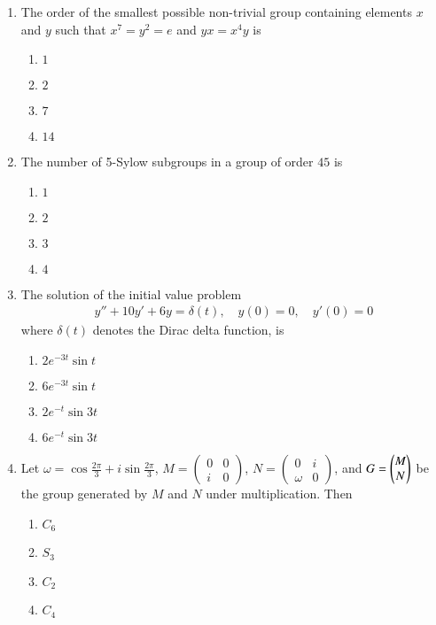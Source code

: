\documentclass[journal]{IEEEtran}
\numberwithin{equation}{enumi}
\numberwithin{figure}{enumi}
\begin{document}
\begin{enumerate}
\item
The order of the smallest possible non-trivial group containing elements $x$ and $y$ such that $x^7 = y^2 = e$ and $yx = x^4 y$ is
\hfill{}
\begin{multicols}{4}
\begin{enumerate}
\item $1$
\item $2$
\item $7$
\item $14$
\end{enumerate}
\end{multicols}

\item
The number of 5-Sylow subgroups in a group of order $45$ is
\hfill{}
\begin{multicols}{4}
\begin{enumerate}
\item $1$
\item $2$
\item $3$
\item $4$
\end{enumerate}
\end{multicols}

\item
The solution of the initial value problem
\begin{align}
y'' + 10y' + 6y = \delta(t), \quad y(0) = 0, \quad y'(0) = 0
\end{align}
where $\delta(t)$ denotes the Dirac delta function, is
\hfill{}
\begin{multicols}{2}
\begin{enumerate}
\item $2 e^{-3t} \sin t$
\item $6 e^{-3t} \sin t$
\item $2 e^{-t} \sin 3t$
\item $6 e^{-t} \sin 3t$
\end{enumerate}
\end{multicols}

\item
Let $\omega = \cos \frac{2\pi}{3} + i \sin \frac{2\pi}{3}$, $M = \begin{pmatrix} 0 & 0 \\ i & 0 \end{pmatrix}$, $N = \begin{pmatrix} 0 & i \\ \omega & 0 \end{pmatrix}$, and $G = \begin{pmatrix}M \\ N\end{pmatrix}$ be the group generated by $M$ and $N$ under multiplication. Then
\hfill{}
\begin{multicols}{4}
\begin{enumerate}
\item $C_6$
\item $S_3$
\item $C_2$
\item $C_4$
\end{enumerate}
\end{multicols}


\end{enumerate}
\end{document}
